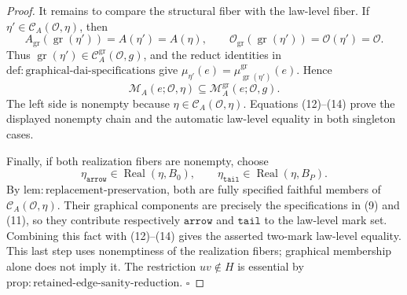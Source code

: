 \documentclass{article}
\begin{document}
\begin{proof}
It remains to compare the structural fiber with the law-level fiber.  If \(\eta'\in\mathcal C_A(\mathcal O,\eta)\), then
\[
 A_{\mathrm{gr}}(\operatorname{gr}(\eta'))=A(\eta')=A(\eta),
 \qquad
 \mathcal O_{\mathrm{gr}}(\operatorname{gr}(\eta'))
 =\mathcal O(\eta')=\mathcal O.
 \tag{13}
\]
Thus \(\operatorname{gr}(\eta')\in\mathcal C_A^{\mathrm{gr}}(\mathcal O,g)\), and the reduct identities in \(\mathrm{def:graphical\mbox{-}dai\mbox{-}specifications}\) give
\(\mu_{\eta'}(e)=\mu^{\mathrm{gr}}_{\operatorname{gr}(\eta')}(e)\).  Hence
\[
 \mathcal M_A(e;\mathcal O,\eta)
 \subseteq\mathcal M_A^{\mathrm{gr}}(e;\mathcal O,g).
 \tag{14}
\]
The left side is nonempty because \(\eta\in\mathcal C_A(\mathcal O,\eta)\).  Equations (12)--(14) prove the displayed nonempty chain and the automatic law-level equality in both singleton cases.

Finally, if both realization fibers are nonempty, choose
\[
 \eta_{\mathtt{arrow}}\in\operatorname{Real}(\eta,B_0),
 \qquad
 \eta_{\mathtt{tail}}\in\operatorname{Real}(\eta,B_P).
\]
By \(\mathrm{lem:replacement\mbox{-}preservation}\), both are fully specified faithful members of \(\mathcal C_A(\mathcal O,\eta)\).  Their graphical components are precisely the specifications in (9) and (11), so they contribute respectively \(\mathtt{arrow}\) and \(\mathtt{tail}\) to the law-level mark set.  Combining this fact with (12)--(14) gives the asserted two-mark law-level equality.  This last step uses nonemptiness of the realization fibers; graphical membership alone does not imply it.  The restriction \(uv\notin H\) is essential by \(\mathrm{prop:retained\mbox{-}edge\mbox{-}sanity\mbox{-}reduction}\).  \(\square\)
\end{proof}
\end{document}
